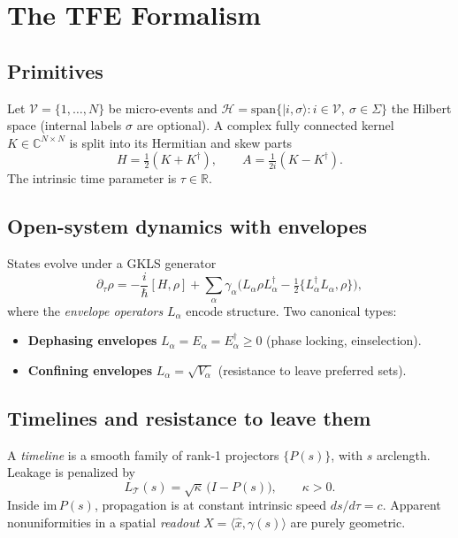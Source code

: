 \documentclass[11pt]{article}
\newcommand{\HH}{\mathcal{H}}
\newcommand{\VV}{\mathcal{V}}
\begin{document}
\section{The TFE Formalism}
\subsection{Primitives}
Let $\VV=\{1,\dots,N\}$ be micro-events and $\HH=\mathrm{span}\{|i,\sigma\rangle: i\in\VV,\ \sigma\in\Sigma\}$ the Hilbert space (internal labels $\sigma$ are optional). A complex fully connected kernel $K\in\mathbb{C}^{N\times N}$ is split into its Hermitian and skew parts
\begin{equation}
H=\tfrac12(K+K^\dagger),\qquad A=\tfrac{1}{2i}(K-K^\dagger).
\end{equation}
The intrinsic time parameter is $\tau\in\mathbb{R}$.

\subsection{Open-system dynamics with envelopes}
States evolve under a GKLS generator
\begin{equation}\label{eq:Lindblad}
\partial_\tau \rho=-\frac{i}{\hbar}[H,\rho]+\sum_\alpha \gamma_\alpha\Big(L_\alpha\rho L_\alpha^\dagger-\tfrac12\{L_\alpha^\dagger L_\alpha,\rho\}\Big),
\end{equation}
where the \emph{envelope operators} $L_\alpha$ encode structure. Two canonical types:
\begin{itemize}
\item \textbf{Dephasing envelopes} $L_\alpha=E_\alpha=E_\alpha^\dagger\ge0$ (phase locking, einselection).
\item \textbf{Confining envelopes} $L_\alpha=\sqrt{V_\alpha}$ (resistance to leave preferred sets).
\end{itemize}

\subsection{Timelines and resistance to leave them}
A \emph{timeline} is a smooth family of rank-1 projectors $\{P(s)\}$, with $s$ arclength. Leakage is penalized by
\begin{equation}\label{eq:timeline}
L_{\mathcal T}(s)=\sqrt{\kappa}\,\big(I-P(s)\big),\qquad \kappa>0.
\end{equation}
Inside $\mathrm{im}\,P(s)$, propagation is at constant intrinsic speed $ds/d\tau=c$. Apparent nonuniformities in a spatial \emph{readout} $X=\langle \hat x,\gamma(s)\rangle$ are purely geometric.
\end{document}
